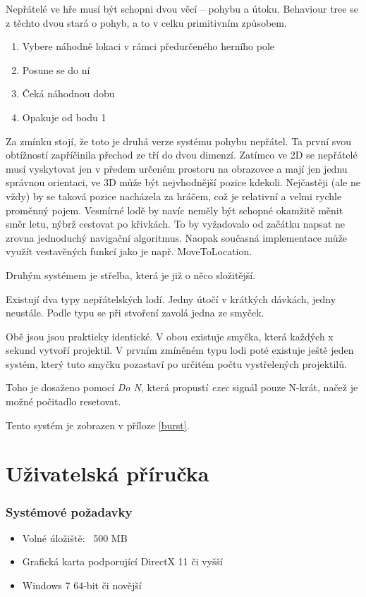 \documentclass[12pt,a4paper,hidelinks]{article}
\begin{document}
Nepřátelé ve hře musí být schopni dvou věcí – pohybu a útoku. Behaviour tree se z těchto dvou stará o pohyb, a to v celku primitivním způsobem.
\begin{enumerate}
	\item Vybere náhodně lokaci v rámci předurčeného herního pole
	\item Posune se do ní
	\item Čeká náhodnou dobu
	\item Opakuje od bodu 1
\end{enumerate}

Za zmínku stojí, že toto je druhá verze systému pohybu nepřátel. Ta první svou obtížností zapříčinila přechod ze tří do dvou dimenzí. Zatímco ve 2D se nepřátelé musí vyskytovat jen v předem určeném prostoru na obrazovce a mají jen jednu správnou orientaci, ve 3D může být nejvhodnější pozice kdekoli. Nejčastěji (ale ne vždy) by se taková pozice nacházela za hráčem, což je relativní a velmi rychle proměnný pojem. Vesmírné lodě by navíc neměly být schopné okamžitě měnit směr letu, nýbrž cestovat po křivkách. To by vyžadovalo od začátku napsat ne zrovna jednoduchý navigační algoritmus. Naopak současná implementace může využít vestavěných funkcí jako je např. MoveToLocation\cite{uedocs:moveto}.

Druhým systémem je střelba, která je již o něco složitější.

Existují dva typy nepřátelských lodí. Jedny útočí v krátkých dávkách, jedny neustále. Podle typu se při stvoření zavolá jedna ze smyček.

Obě jsou jsou prakticky identické. V obou existuje smyčka, která každých x sekund vytvoří projektil. V prvním zmíněném typu lodi poté existuje ještě jeden systém, který tuto smyčku pozastaví po určitém počtu vystřelených projektilů.

Toho je dosaženo pomocí \textit{Do N}\cite{uedocs:don}, která propustí \textit{exec} signál pouze N-krát, načež je možné počitadlo resetovat.

Tento systém je zobrazen v příloze \ref{burst}.

\clearpage
\part{Uživatelská příručka}
\section{Systémové požadavky}
\begin{itemize}
	\item Volné úložiště: ~500 MB
	\item Grafická karta podporující DirectX 11 či vyšší
	\item Windows 7 64-bit či novější
\end{itemize}
\end{document}
